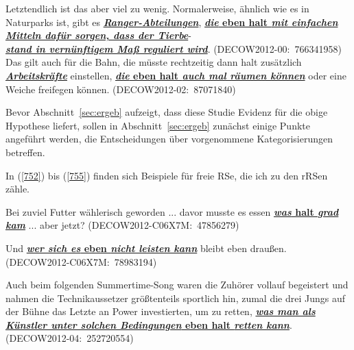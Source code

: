 \begin{exe}
	\ex\label{751} 
		\begin{xlist}	
		\ex\label{751a} 
		\scriptsize
		Letztendlich ist das aber viel zu wenig. Normalerweise, ähnlich wie es in Naturparks ist, gibt es 								\underline{\textbf{\textit{Ranger-Abteilungen}}}, \underline{\textbf{\textit{die} eben halt \textit{mit einfachen 				Mitteln dafür sorgen, dass der Tierbe}}}- \\ \underline{\textit{\textbf{stand in vernünftigem Maß reguliert wird}}}. 
	 	\hfill\hbox{(DECOW2012-00: 766341958)}
	 	\newline
	 	\hbox{}\hfill\hbox{\citet[168]{Mueller2016a}}
	 	\ex\label{751b} 
	 	\scriptsize
	 	Das gilt auch für die Bahn, die müsste rechtzeitig dann halt zusätzlich \underline{\textbf{\textit{Arbeitskräfte}}} 			einstellen, \underline{\textbf{\textit{die} eben halt \textit{auch mal räumen können}}} oder eine Weiche freifegen 				können.
		\newline		
	 	\hbox{}\hfill\hbox{(DECOW2012-02: 87071840)}
		\end{xlist}
\end{exe} 
Bevor Abschnitt~\ref{sec:ergeb} aufzeigt, dass diese Studie Evidenz für die obige Hypothese liefert, sollen in Abschnitt~\ref{sec:ergeb} zunächst einige Punkte angeführt werden, die Entscheidungen über vorgenommene Kategorisierungen betreffen.

\label{sec:berstruk}
In (\ref{752}) bis (\ref{755}) finden sich Beispiele für  freie RSe, die ich zu den rRSen zähle.
	
\begin{exe}
	\ex\label{752} 
	\scriptsize
	Bei zuviel Futter wählerisch geworden ... davor musste es essen \underline{\textbf{\textit{was} halt \textit{grad kam}}} 		... aber jetzt?
	\newline
	\hbox{}\hfill\hbox {(DECOW2012-C06X7M: 47856279)}
\end{exe}
\vspace{-0.65cm}
\begin{exe}
	\ex\label{753} 
	\scriptsize
	Und \underline{\textbf{\textit{wer sich es} eben \textit{nicht leisten kann}}} bleibt eben draußen.
	\newline		
	\hbox{}\hfill\hbox{(DECOW2012-C06X7M: 78983194)}
\end{exe}			       

\begin{exe}
	\ex\label{754} 
	\scriptsize
	Auch beim folgenden \glqq Summertime\grqq{}-Song waren die Zuhörer vollauf begeistert und nahmen die Technikaussetzer 			größtenteils sportlich hin, zumal die drei Jungs auf der Bühne das Letzte an Power investierten, um zu retten, 					\underline{\textbf{\textit{was man als Künstler unter solchen Bedingungen} eben halt \textit{retten kann}}}.                                               
	\newline		
	\hbox{}\hfill\hbox{(DECOW2012-04: 252720554)}
\end{exe}
 
